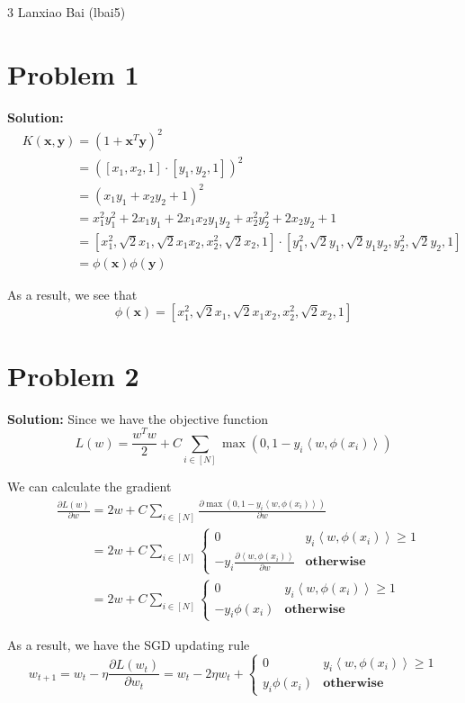 \documentclass[11pt]{article}
\begin{document}
\homework
    {3}
    {Lanxiao Bai (lbai5)}
    {}

\section*{Problem 1}
\textbf{Solution:} 
	\begin{align}
		&K(\mathbf{x}, \mathbf{y}) = (1 + \mathbf{x}^T\mathbf{y})^2\nonumber\\
		&\phantom{K(\mathbf{x}, \mathbf{y})} = ([x_1, x_2, 1]\cdot[y_1, y_2, 1])^2\nonumber\\
		&\phantom{K(\mathbf{x}, \mathbf{y})} = (x_1y_1 + x_2y_2 + 1)^2\nonumber\\
		&\phantom{K(\mathbf{x}, \mathbf{y})} = x_1^2y_1^2 + 2x_1y_1 + 2x_1x_2y_1y_2 + x_2^2y_2^2 + 2x_2y_2 + 1\nonumber\\
		&\phantom{K(\mathbf{x}, \mathbf{y})} = [x_1^2, \sqrt{2}x_1, \sqrt{2}x_1x_2, x_2^2, \sqrt{2}x_2, 1] \cdot [y_1^2, \sqrt{2}y_1, \sqrt{2}y_1y_2, y_2^2, \sqrt{2}y_2, 1]\nonumber\\
		&\phantom{K(\mathbf{x}, \mathbf{y})} = \phi(\mathbf{x})\phi(\mathbf{y})\nonumber
	\end{align}
	
	As a result, we see that
	\[\phi(\mathbf{x}) = [x_1^2, \sqrt{2}x_1, \sqrt{2}x_1x_2, x_2^2, \sqrt{2}x_2, 1] \]
	
\section*{Problem 2}
\textbf{Solution:} Since we have the objective function
\[L(w) = \frac{w^Tw}{2} + C\sum_{i \in [N]} \max(0, 1 - y_i\left<w, \phi(x_i)\right>)\]

We can calculate the gradient
\begin{align}
	&\frac{\partial L(w)}{\partial w} = 2w + C \sum_{i \in [N]}\frac{\partial \max(0, 1 - y_i\left<w, \phi(x_i)\right>)}{\partial w}\nonumber\\
	&\phantom{\frac{\partial L(w)}{\partial w}} = 2w + C \sum_{i \in [N]} 
	\begin{cases}
		0 & y_i\left<w, \phi(x_i)\right> \geq 1\\
		-y_i\frac{\partial \left<w, \phi(x_i)\right>}{\partial w} & \textbf{otherwise}
	\end{cases}\nonumber\\
	&\phantom{\frac{\partial L(w)}{\partial w}} = 2w + C \sum_{i \in [N]}
	\begin{cases}
		0 & y_i\left<w, \phi(x_i)\right> \geq 1\\
		-y_i\phi(x_i) & \textbf{otherwise}
	\end{cases}\nonumber
\end{align}

As a result, we have the SGD updating rule
\[w_{t + 1} = w_t - \eta \frac{\partial L(w_t)}{\partial w_t} = w_t - 2\eta w_t + 
\begin{cases}
		0 & y_i\left<w, \phi(x_i)\right> \geq 1\\
		y_i\phi(x_i) & \textbf{otherwise}
	\end{cases}\]
\newpage 


\end{document}
